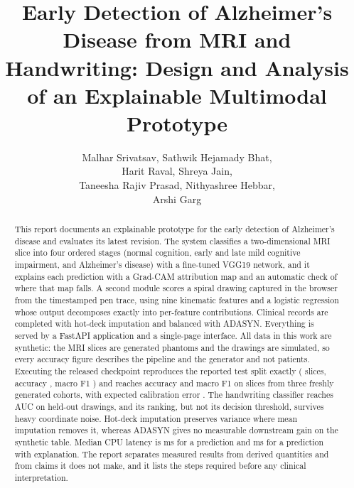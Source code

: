 \documentclass[conference]{IEEEtran}
\begin{document}
\title{Early Detection of Alzheimer's Disease from MRI and Handwriting: Design and Analysis of an Explainable Multimodal Prototype}

\author{Malhar Srivatsav, Sathwik Hejamady Bhat,\\
Harit Raval, Shreya Jain,\\
Taneesha Rajiv Prasad, Nithyashree Hebbar,\\
Arshi Garg}

\maketitle

\begin{abstract}
This report documents an explainable prototype for the early detection of Alzheimer's disease and evaluates its latest revision. The system classifies a two-dimensional MRI slice into four ordered stages (normal cognition, early and late mild cognitive impairment, and Alzheimer's disease) with a fine-tuned VGG19 network, and it explains each prediction with a Grad-CAM attribution map and an automatic check of where that map falls. A second module scores a spiral drawing captured in the browser from the timestamped pen trace, using nine kinematic features and a logistic regression whose output decomposes exactly into per-feature contributions. Clinical records are completed with hot-deck imputation and balanced with ADASYN. Everything is served by a FastAPI application and a single-page interface. All data in this work are synthetic: the MRI slices are generated phantoms and the drawings are simulated, so every accuracy figure describes the pipeline and the generator and not patients. Executing the released checkpoint reproduces the reported test split exactly (\EOneN{} slices, accuracy \EOneAcc{}, macro F1 \EOneFone{}) and reaches accuracy \PoolAcc{} and macro F1 \PoolFone{} on \PoolN{} slices from three freshly generated cohorts, with expected calibration error \PoolEce{}. The handwriting classifier reaches AUC \HwAuc{} on \HwHeldN{} held-out drawings, and its ranking, but not its decision threshold, survives heavy coordinate noise. Hot-deck imputation preserves variance where mean imputation removes it, whereas ADASYN gives no measurable downstream gain on the synthetic table. Median CPU latency is \PredictMedian{} ms for a prediction and \ExplainMedian{} ms for a prediction with explanation. The report separates measured results from derived quantities and from claims it does not make, and it lists the steps required before any clinical interpretation.
\end{abstract}
\end{document}

